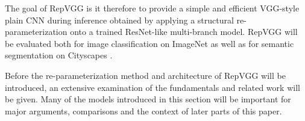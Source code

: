 The goal of RepVGG is it therefore to provide a simple and efficient VGG-style plain CNN during inference obtained by applying a structural re-parameterization onto a trained ResNet-like multi-branch model. RepVGG will be evaluated both for image classification on ImageNet \cite{Deng.2009} as well as for semantic segmentation on Cityscapes \cite{Cordts.2016}. 

Before the re-parameterization method and architecture of RepVGG will be introduced, an extensive examination of the fundamentals and related work will be given. Many of the models introduced in this section will be important for major arguments, comparisons and the context of later parts of this paper. 